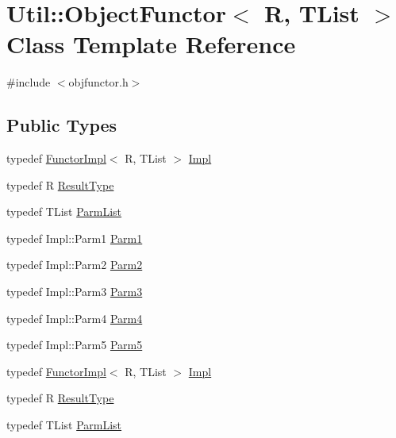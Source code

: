 \hypertarget{classUtil_1_1ObjectFunctor}{}\section{Util\+:\+:Object\+Functor$<$ R, T\+List $>$ Class Template Reference}
\label{classUtil_1_1ObjectFunctor}


{\ttfamily \#include $<$objfunctor.\+h$>$}

\subsection*{Public Types}
\begin{DoxyCompactItemize}
\item 
typedef \mbox{\hyperlink{classUtil_1_1FunctorImpl}{Functor\+Impl}}$<$ R, T\+List $>$ \mbox{\hyperlink{classUtil_1_1ObjectFunctor_a93fc635194d1d2768e73ba87d03abd8d}{Impl}}
\item 
typedef R \mbox{\hyperlink{classUtil_1_1ObjectFunctor_a77f816e98108848347d0dfc085090a1c}{Result\+Type}}
\item 
typedef T\+List \mbox{\hyperlink{classUtil_1_1ObjectFunctor_ae0ad0a2f4b9f3a67014d4fc237df3c99}{Parm\+List}}
\item 
typedef Impl\+::\+Parm1 \mbox{\hyperlink{classUtil_1_1ObjectFunctor_a199715d28029627c2ae7219c13b04d26}{Parm1}}
\item 
typedef Impl\+::\+Parm2 \mbox{\hyperlink{classUtil_1_1ObjectFunctor_a6809cf65883dc7575e01d9b9849649cf}{Parm2}}
\item 
typedef Impl\+::\+Parm3 \mbox{\hyperlink{classUtil_1_1ObjectFunctor_a6becd26610c6091b9ba93cd96f3def66}{Parm3}}
\item 
typedef Impl\+::\+Parm4 \mbox{\hyperlink{classUtil_1_1ObjectFunctor_a54ce0b64981cd7f558ce8eea7df3f1b2}{Parm4}}
\item 
typedef Impl\+::\+Parm5 \mbox{\hyperlink{classUtil_1_1ObjectFunctor_a8428e04dd3fb91bc7f7c518a1771eecb}{Parm5}}
\item 
typedef \mbox{\hyperlink{classUtil_1_1FunctorImpl}{Functor\+Impl}}$<$ R, T\+List $>$ \mbox{\hyperlink{classUtil_1_1ObjectFunctor_a93fc635194d1d2768e73ba87d03abd8d}{Impl}}
\item 
typedef R \mbox{\hyperlink{classUtil_1_1ObjectFunctor_a77f816e98108848347d0dfc085090a1c}{Result\+Type}}
\item 
typedef T\+List \mbox{\hyperlink{classUtil_1_1ObjectFunctor_ae0ad0a2f4b9f3a67014d4fc237df3c99}{Parm\+List}}

\end{DoxyCompactItemize}
